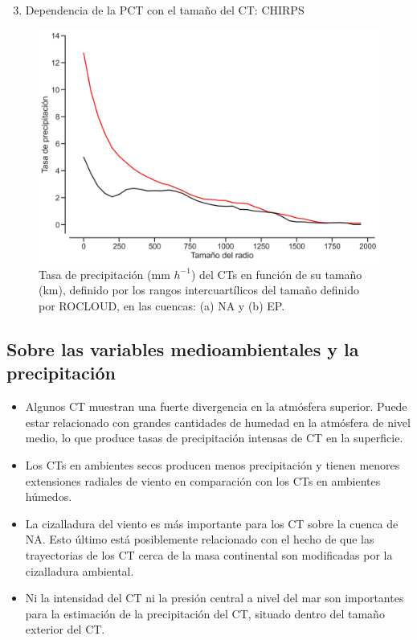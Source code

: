 \begin{frame}
\begin{enumerate}
\setcounter{enumi}{2}
    \item Dependencia de la PCT con el tamaño del CT: CHIRPS
\end{enumerate}
    \begin{figure}
        \centering
        \includegraphics[scale = 0.35]{Images/Figures/Fig_3_21.jpeg}
        \caption{Tasa de precipitación (mm $h^{-1}$) del CTs en función de su tamaño (km), definido por los rangos intercuartílicos del tamaño definido por ROCLOUD, en las cuencas: (a) {\red NA} y (b) {\gray EP}.}
        \label{fig:figchirps}
    \end{figure}
\end{frame}

\subsection{Sobre las variables medioambientales y la precipitación}
\begin{frame}
\begin{itemize}
    \item Algunos CT muestran una fuerte divergencia en la atmósfera superior. Puede estar relacionado con grandes cantidades de humedad en la atmósfera de nivel medio, lo que produce tasas de precipitación intensas de CT en la superficie.

    \item Los CTs en ambientes secos producen menos precipitación y tienen menores extensiones radiales de viento en comparación con los CTs en ambientes húmedos.

    \item La cizalladura del viento es más importante para los CT sobre la cuenca de {\red NA}. Esto último está posiblemente relacionado con el hecho de que las trayectorias de los CT cerca de la masa continental son modificadas por la cizalladura ambiental.

    \item Ni la intensidad del CT ni la presión central a nivel del mar son importantes para la estimación de la precipitación del CT, situado dentro del tamaño exterior del CT.
\end{itemize}
\end{frame}

